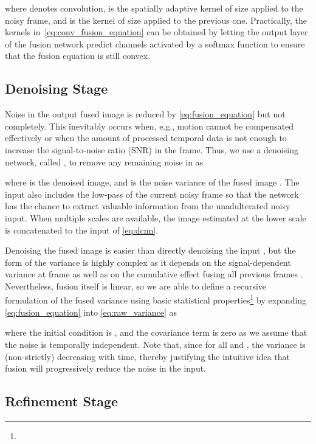 \documentclass[final]{cvpr}
\begin{document}
    where  denotes convolution,  is the spatially adaptive kernel of size  applied to the noisy frame, and  is the kernel of size  applied to the previous one. Practically, the kernels in~\eqref{eq:conv_fusion_equation} can be obtained by letting the output layer of the fusion network predict  channels activated by a softmax function to ensure that the fusion equation is still convex. 
    
    
    \subsection{Denoising Stage}
    
    Noise in the output fused image  is reduced by \eqref{eq:fusion_equation} but not completely. This inevitably occurs when, e.g., motion cannot be compensated effectively or when the amount of processed temporal data is not enough to increase the signal-to-noise ratio (SNR) in the frame. Thus, we use a denoising network, called , to remove any remaining noise in  as
    
    where  is the denoised image, and  is the noise variance of the fused image . The input also includes the low-pass of the current noisy frame  so that the network has the chance to extract valuable information from the unadulterated noisy input. When multiple scales are available, the image estimated at the lower scale is concatenated to the input of \eqref{eq:dcnn}.
    
    Denoising the fused image  is easier than directly denoising the input , but the form of the variance  is highly complex as it depends on the signal-dependent variance at frame  as well as on the cumulative effect fusing all previous frames . Nevertheless, fusion itself is linear, so we are able to define a recursive formulation of the fused variance using basic statistical properties\footnote{} by expanding \eqref{eq:fusion_equation} into \eqref{eq:raw_variance} as
    
    where the initial condition is , and the covariance term is zero as we assume that the noise is temporally independent. Note that, since  for all  and , the variance  is (non-strictly) decreasing with time, thereby justifying the intuitive idea that fusion will progressively reduce the noise in the input.
    
    
    \subsection{Refinement Stage}
\end{document}
